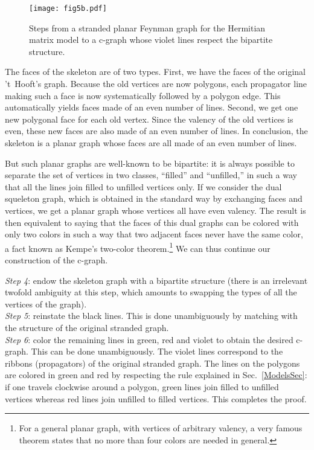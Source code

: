 \documentclass[12pt]{article}
\numberwithin{equation}{section}
\begin{document}
%
\begin{figure}
\centerline{\texttt{[image: fig5b.pdf]}}
\caption{Steps from a stranded planar Feynman graph for the Hermitian matrix model to a c-graph whose violet lines respect the bipartite structure.\label{fig5}}
\end{figure}
%

The faces of the skeleton are of two types. First, we have the faces of the original 't~Hooft's graph. Because the old vertices are now polygons, each propagator line making such a face is now systematically followed by a polygon edge. This automatically yields faces made of an even number of lines. Second, we get one new polygonal face for each old vertex. Since the valency of the old vertices is even, these new faces are also made of an even number of lines. In conclusion, the skeleton is a planar graph whose faces are all made of an even number of lines.

But such planar graphs are well-known to be bipartite: it is always possible to separate the set of vertices in two classes, ``filled'' and ``unfilled,'' in such a way that all the lines join filled to unfilled vertices only. If we consider the dual squeleton graph, which is obtained in the standard way by exchanging faces and vertices, we get a planar graph whose vertices all have even valency. The result is then equivalent to saying that the faces of this dual graphs can be colored with only two colors in such a way that two adjacent faces never have the same color, a fact known as Kempe's two-color theorem.\footnote{For a general planar graph, with vertices of arbitrary valency, a very famous theorem states that no more than four colors are needed in general.} We can thus continue our construction of the c-graph.

\noindent\emph{Step 4}: endow the skeleton graph with a bipartite structure (there is an irrelevant twofold ambiguity at this step, which amounts to swapping the types of all the vertices of the graph).\\
\emph{Step 5}: reinstate the black lines. This is done unambiguously by matching with the structure of the original stranded graph.\\
\emph{Step 6}: color the remaining lines in green, red and violet to obtain the desired c-graph. This can be done unambiguously. The violet lines correspond to the ribbons (propagators) of the original stranded graph. The lines on the polygons are colored in green and red by respecting the rule explained in Sec.\ \ref{ModelsSec}: if one travels clockwise around a polygon, green lines join filled to unfilled vertices whereas red lines join unfilled to filled vertices. This completes the proof.
\end{document}
